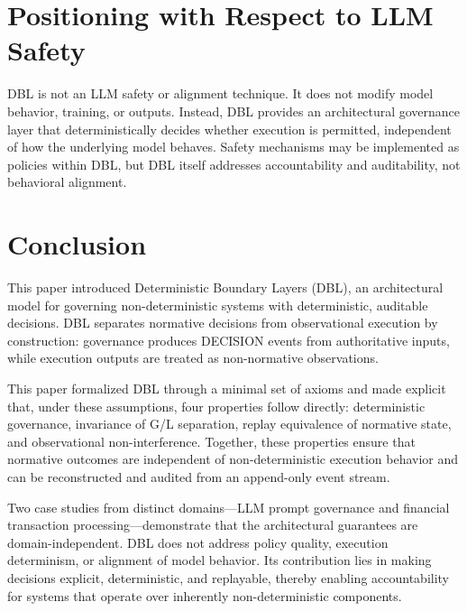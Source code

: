 \documentclass[11pt]{article}
\begin{document}
\section{Positioning with Respect to LLM Safety}

DBL is not an LLM safety or alignment technique. It does not modify model behavior, training, or outputs. Instead, DBL provides an architectural governance layer that deterministically decides whether execution is permitted, independent of how the underlying model behaves. Safety mechanisms may be implemented as policies within DBL, but DBL itself addresses accountability and auditability, not behavioral alignment.



\section{Conclusion}

This paper introduced Deterministic Boundary Layers (DBL), an architectural model for governing non-deterministic systems with deterministic, auditable decisions. DBL separates normative decisions from observational execution by construction: governance produces DECISION events from authoritative inputs, while execution outputs are treated as non-normative observations.

This paper formalized DBL through a minimal set of axioms and made explicit that, under these assumptions, four properties follow directly: deterministic governance, invariance of G/L separation, replay equivalence of normative state, and observational non-interference. Together, these properties ensure that normative outcomes are independent of non-deterministic execution behavior and can be reconstructed and audited from an append-only event stream.

Two case studies from distinct domains---LLM prompt governance and financial transaction processing---demonstrate that the architectural guarantees are domain-independent. DBL does not address policy quality, execution determinism, or alignment of model behavior. Its contribution lies in making decisions explicit, deterministic, and replayable, thereby enabling accountability for systems that operate over inherently non-deterministic components.



\end{document}
